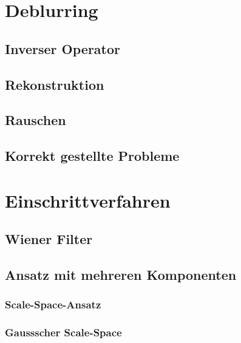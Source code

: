 \documentclass[a4paper, 11pt, accentcolor = tud3b]{tudreport}
\begin{document}
		\section{Deblurring} %

			\subsection{Inverser Operator} %

			\subsection{Rekonstruktion} %

			\subsection{Rauschen} %

			\subsection{Korrekt gestellte Probleme} %

		\section{Einschrittverfahren} %

			\subsection{Wiener Filter} %

			\subsection{Ansatz mit mehreren Komponenten} %

				\subsubsection{Scale-Space-Ansatz} %

				\subsubsection{Gaussscher Scale-Space} %
\end{document}
